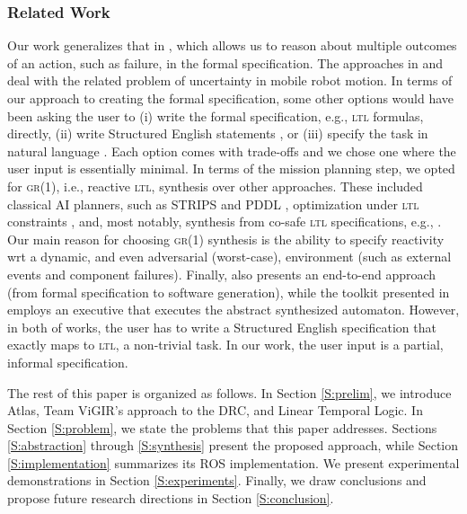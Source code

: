 \subsubsection*{Related Work}
Our work generalizes that in \cite{Vasu2013ICRA}, which allows us to reason about multiple outcomes of an action, such as failure, in the formal specification.
The approaches in \cite{Jon2015ICRA} and \cite{Kavraki2012ICRA} deal with the related problem of uncertainty in mobile robot motion.
In terms of our approach to creating the formal specification, some other options would have been asking the user to (i) write the formal specification, e.g., \textsc{ltl} formulas, directly, (ii) write Structured English statements \cite{JFRKG2012ICRA}, or (iii) specify the task in natural language \cite{Lignos2015AURO}.
Each option comes with trade-offs and we chose one where the user input is essentially minimal.
In terms of the mission planning step, we opted for \textsc{gr(1)}, i.e., reactive \textsc{ltl}, synthesis \cite{Bloem2012GR1} over other approaches.
These included classical AI planners, such as STRIPS \cite{STRIPS1971AI} and PDDL \cite{PDDL1998TR}, optimization under \textsc{ltl} constraints \cite{Wolff2014ICRA}, and, most notably, synthesis from co-safe \textsc{ltl} specifications, e.g., \cite{Kavraki2015ICRA}.
Our main reason for choosing \textsc{gr(1)} synthesis is the ability to specify reactivity \ac{wrt} a dynamic, and even adversarial (worst-case), environment (such as external events and component failures).
Finally, \cite{Ankur2015ISRR} also presents an end-to-end approach (from formal specification to software generation), while the toolkit presented in \cite{Finucane2010IROS} employs an executive that executes the abstract synthesized automaton.
However, in both of works, the user has to write a Structured English \cite{JFRKG2012ICRA} specification that exactly maps to \textsc{ltl}, a non-trivial task.
In our work, the user input is a partial, informal specification.

The rest of this paper is organized as follows.
In Section \ref{S:prelim}, we introduce Atlas, Team ViGIR's approach to the DRC, and Linear Temporal Logic.
In Section \ref{S:problem}, we state the problems that this paper addresses.
Sections \ref{S:abstraction} through \ref{S:synthesis} present the proposed approach, while Section \ref{S:implementation} summarizes its ROS implementation.
We present experimental demonstrations in Section \ref{S:experiments}.
Finally, we draw conclusions and propose future research directions in Section \ref{S:conclusion}.

